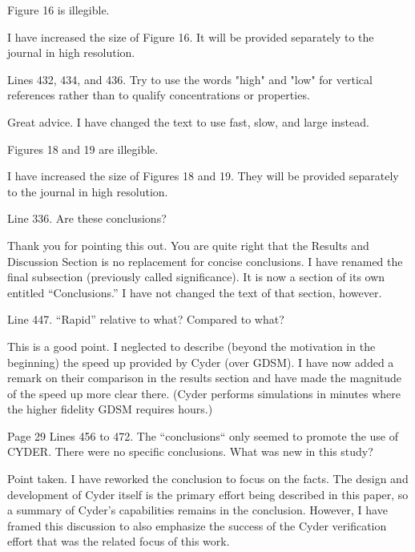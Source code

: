 \documentclass[answers,12pt]{exam}
\begin{document}
\begin{questions}
\question Figure 16 is illegible.
\begin{solution}
I have increased the size of Figure 16.
        It will be provided separately to the journal in high resolution.  
\end{solution}

 

\question Lines 432, 434, and 436. Try to use the words "high" and "low" for 
vertical references rather than to qualify concentrations or properties.
\begin{solution}
Great advice. I have changed the text to use fast, slow, and large instead.
\end{solution}

 

\question Figures 18 and 19 are illegible.
\begin{solution}
I have increased the size of Figures 18 and 19.
        They will be provided separately to the journal in high resolution.  
\end{solution}

 

\question Line 336. Are these conclusions?
\begin{solution}
Thank you for pointing this out. You are quite right that the Results and 
        Discussion Section is no replacement for concise conclusions. I have 
        renamed the final subsection (previously called significance). It is now 
        a section of its own entitled ``Conclusions.'' I have not changed the 
text of that section, however.  \end{solution}

 

\question Line 447. ``Rapid'' relative to what? Compared to what?
\begin{solution}
        This is a good point. I neglected to describe (beyond the motivation in 
        the beginning) the speed up provided by Cyder (over GDSM). I have now 
        added a remark on their comparison in the results section and have made 
        the magnitude of the speed up more clear there. (Cyder performs 
simulations in minutes where the higher fidelity GDSM requires hours.) 
\end{solution}

 

\question Page 29 Lines 456 to 472. The ``conclusions`` only seemed to promote 
the use of CYDER. There were no specific conclusions. What was new in this 
study?  \begin{solution}
Point taken. I have reworked the conclusion to focus on the facts. The design 
        and development of Cyder itself is the primary effort being described 
        in this paper, so a summary of Cyder's capabilities remains in the 
        conclusion. However, I have framed this discussion to also emphasize 
        the success of the Cyder verification effort that was the related focus 
        of this work.
\end{solution}



\end{questions}
\end{document}
